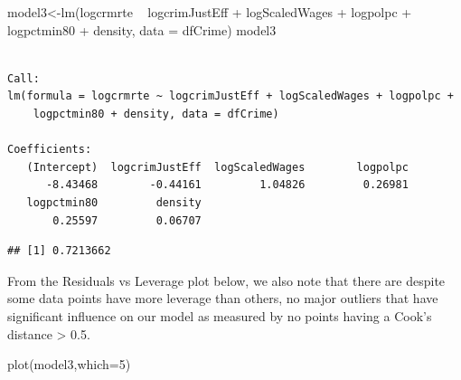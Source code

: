 \documentclass[]{article}
\newenvironment{Shaded}{}{}
\newcommand{\DataTypeTok}[1]{#1}
\newcommand{\DecValTok}[1]{#1}
\newcommand{\KeywordTok}[1]{\textcolor[rgb]{0.00,0.00,1.00}{#1}}
\newcommand{\NormalTok}[1]{#1}
\newcommand{\OperatorTok}[1]{#1}
\newcommand{\StringTok}[1]{\textcolor[rgb]{0.00,0.50,0.50}{#1}}
\begin{document}
\begin{Shaded}
\begin{Highlighting}[]
\NormalTok{model3<-}\KeywordTok{lm}\NormalTok{(logcrmrte }\OperatorTok{~}\StringTok{ }\NormalTok{logcrimJustEff }\OperatorTok{+}\StringTok{ }\NormalTok{logScaledWages }\OperatorTok{+}\StringTok{  }\NormalTok{logpolpc  }
              \OperatorTok{+}\StringTok{ }\NormalTok{logpctmin80 }\OperatorTok{+}\StringTok{ }\NormalTok{density, }\DataTypeTok{data =}\NormalTok{ dfCrime)}
\NormalTok{model3}
\end{Highlighting}
\end{Shaded}

\begin{verbatim}

Call:
lm(formula = logcrmrte ~ logcrimJustEff + logScaledWages + logpolpc + 
    logpctmin80 + density, data = dfCrime)

Coefficients:
   (Intercept)  logcrimJustEff  logScaledWages        logpolpc  
      -8.43468        -0.44161         1.04826         0.26981  
   logpctmin80         density  
       0.25597         0.06707  
\end{verbatim}

\begin{Shaded}
\end{Shaded}

\begin{verbatim}
## [1] 0.7213662
\end{verbatim}

From the Residuals vs Leverage plot below, we also note that there are
despite some data points have more leverage than others, no major
outliers that have significant influence on our model as measured by no
points having a Cook's distance \textgreater{} 0.5.

\begin{Shaded}
\begin{Highlighting}[]
\KeywordTok{plot}\NormalTok{(model3,}\DataTypeTok{which=}\DecValTok{5}\NormalTok{)}
\end{Highlighting}
\end{Shaded}
\end{document}
